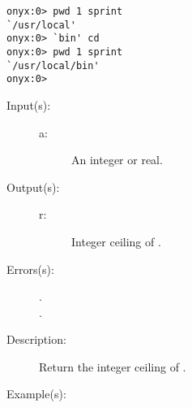 \begin{description}
\begin{description}
\begin{verbatim}
onyx:0> pwd 1 sprint
`/usr/local'
onyx:0> `bin' cd
onyx:0> pwd 1 sprint
`/usr/local/bin'
onyx:0>
		\end{verbatim}
	\end{description}
\label{systemdict:ceiling}
\item[{\onyxop{a}{ceiling}{r}}: ]
	\begin{description}\item[]
	\item[Input(s): ]
		\begin{description}\item[]
		\item[a: ]
			An integer or real.
		\end{description}
	\item[Output(s): ]
		\begin{description}\item[]
		\item[r: ]
			Integer ceiling of .
		\end{description}
	\item[Errors(s): ]
		\begin{description}\item[]
		\item[.]
		\item[.]
		\end{description}
	\item[Description: ]
		Return the integer ceiling of .
	\item[Example(s): ]\begin{verbatim}


\end{verbatim}
\end{description}
\end{description}
